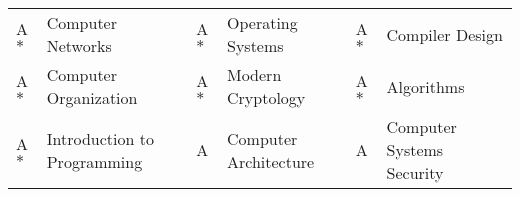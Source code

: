 

{\fontsize{11pt}{1em}\bodyfontlight\upshape\color{text}
\begin{tabular*}{\textwidth}{L{0.4cm} L{\textwidth/3 - 1cm} L{0.4cm}
  L{\textwidth/3 - 1cm} L{0.4cm} L{\textwidth/3 - 1cm}}
  A$*$ & Computer Networks & A$*$ & Operating Systems & A$*$ & Compiler Design \\
  A$*$ & Computer Organization & A$*$ & Modern Cryptology & A$*$ & Algorithms \\
  A$*$ & Introduction to Programming & A & Computer Architecture & A & Computer Systems Security \\
\end{tabular*}
}



